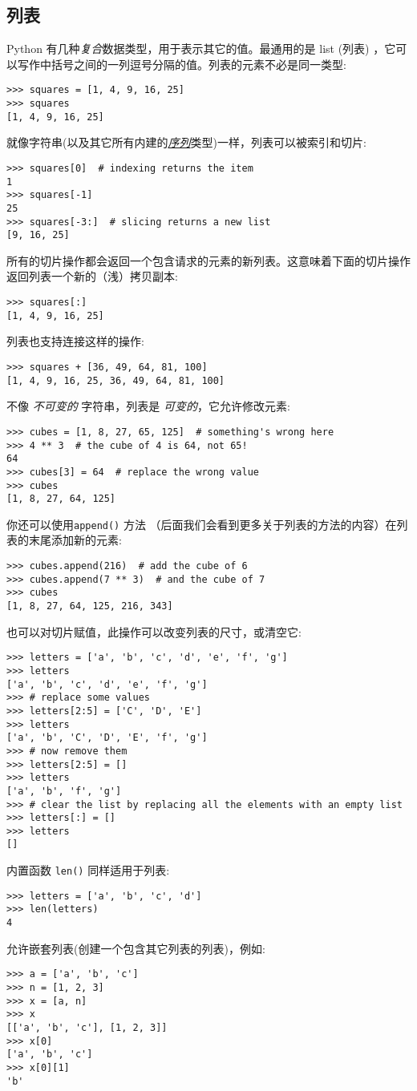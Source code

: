 \subsection{列表}
Python 有几种\emph{复合}数据类型，用于表示其它的值。最通用的是 list (列表) ，它可以写作中括号之间的一列逗号分隔的值。列表的元素不必是同一类型:
\begin{lstlisting}
>>> squares = [1, 4, 9, 16, 25]
>>> squares
[1, 4, 9, 16, 25]
\end{lstlisting}
就像字符串(以及其它所有内建的\href{https://docs.python.org/3/glossary.html#term-sequence}{\emph{序列}}类型)一样，列表可以被索引和切片:
\begin{lstlisting}
>>> squares[0]  # indexing returns the item
1
>>> squares[-1]
25
>>> squares[-3:]  # slicing returns a new list
[9, 16, 25]
\end{lstlisting}
所有的切片操作都会返回一个包含请求的元素的新列表。这意味着下面的切片操作返回列表一个新的（浅）拷贝副本:
\begin{lstlisting}
>>> squares[:]
[1, 4, 9, 16, 25]
\end{lstlisting}
列表也支持连接这样的操作:
\begin{lstlisting}
>>> squares + [36, 49, 64, 81, 100]
[1, 4, 9, 16, 25, 36, 49, 64, 81, 100]
\end{lstlisting}
不像 \emph{不可变的} 字符串，列表是 \emph{可变的}，它允许修改元素:
\begin{lstlisting}
>>> cubes = [1, 8, 27, 65, 125]  # something's wrong here
>>> 4 ** 3  # the cube of 4 is 64, not 65!
64
>>> cubes[3] = 64  # replace the wrong value
>>> cubes
[1, 8, 27, 64, 125]
\end{lstlisting}
你还可以使用\texttt{append()} 方法 （后面我们会看到更多关于列表的方法的内容）在列表的末尾添加新的元素:
\begin{lstlisting}
>>> cubes.append(216)  # add the cube of 6
>>> cubes.append(7 ** 3)  # and the cube of 7
>>> cubes
[1, 8, 27, 64, 125, 216, 343]
\end{lstlisting}
也可以对切片赋值，此操作可以改变列表的尺寸，或清空它:
\begin{lstlisting}
>>> letters = ['a', 'b', 'c', 'd', 'e', 'f', 'g']
>>> letters
['a', 'b', 'c', 'd', 'e', 'f', 'g']
>>> # replace some values
>>> letters[2:5] = ['C', 'D', 'E']
>>> letters
['a', 'b', 'C', 'D', 'E', 'f', 'g']
>>> # now remove them
>>> letters[2:5] = []
>>> letters
['a', 'b', 'f', 'g']
>>> # clear the list by replacing all the elements with an empty list
>>> letters[:] = []
>>> letters
[]
\end{lstlisting}
内置函数 \texttt{len()} 同样适用于列表:
\begin{lstlisting}
>>> letters = ['a', 'b', 'c', 'd']
>>> len(letters)
4
\end{lstlisting}
允许嵌套列表(创建一个包含其它列表的列表)，例如:
\begin{lstlisting}
>>> a = ['a', 'b', 'c']
>>> n = [1, 2, 3]
>>> x = [a, n]
>>> x
[['a', 'b', 'c'], [1, 2, 3]]
>>> x[0]
['a', 'b', 'c']
>>> x[0][1]
'b'
\end{lstlisting}
